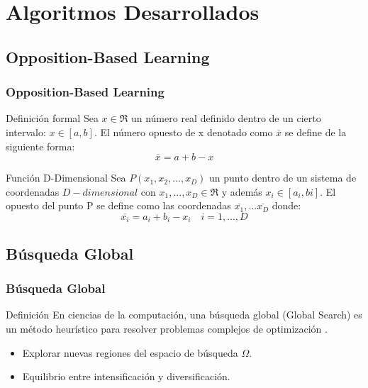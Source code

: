 
\section{Algoritmos Desarrollados}

\subsection{Opposition-Based Learning}
\begin{frame}
\frametitle{Opposition-Based Learning}
\begin{block}{Definición formal}
Sea $x \in \Re $  un número real definido dentro de un cierto intervalo: $x \in [a,b]$. El número opuesto de x denotado como $\overline{x}$ se define de la siguiente forma:
 \begin{equation}
     \overline{x} = a + b - x 
 \end{equation}
 \end{block}
 \begin{block}{Función D-Dimensional}
Sea $ P(x_{1}, x_{2},...,x_{D}) $ un punto dentro de un sistema de coordenadas $D-dimensional$ con $ x_{1},...,x_{D} \in \Re$ y además $ x_{i} \in [a_{i}, b{i}]$. El opuesto del punto P se define como las coordenadas $\overline{x_{1}},...\overline{x_{D}}$ donde:
\begin{equation}
    \overline{x_{i}} = a_{i} + b_{i} - x_{i} \quad i = 1,...,D 
\end{equation}
 \end{block}
\end{frame}

\subsection{Búsqueda Global}
\begin{frame}
\frametitle{Búsqueda Global} \label{sec:BG}
\begin{block}{Definición}
En ciencias de la computación, una búsqueda global (Global Search) es un método heurístico para resolver problemas complejos de optimización \cite{GlobalSearch, GlobalSearch2, GlobalSearch3}.
\begin{itemize}
  \item Explorar nuevas regiones del espacio de búsqueda $\Omega$.
  \item Equilibrio entre intensificación y diversificación.
\end{itemize}
 \end{block}
\end{frame}

